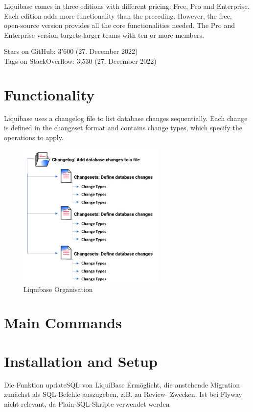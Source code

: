 %
Liquibase \cite{Liquibase} comes in three editions with different pricing: Free, Pro and Enterprise. Each edition adds more functionality than the preceding. However, the free, open-source version provides all the core functionalities needed. The Pro and Enterprise version targets larger teams with ten or more members. 

%
Stars on GitHub: 3'600 (27. December 2022)\\
Tags on StackOverflow: 3,530 (27. December 2022)\\

\section{Functionality}
%
Liquibase uses a changelog file to list database changes sequentially. Each change is defined in the changeset format and contains change types, which specify the operations to apply.

\begin{figure}[H]
	\centering
	\includegraphics[width=0.65\textwidth]{./chapters/intro_liquibase/images/changelog-structure.png}
	\caption[Liquibase Organisation - Source: \cite{Liquibase}]{Liquibase Organisation}
	\label{fig:IntroductionToLiquibase:LiquibaseChangelogStructure}
\end{figure}


\section{Main Commands}



\section{Installation and Setup}
Die Funktion updateSQL von LiquiBase
Ermöglicht, die anstehende Migration zunächst als SQL-Befehle auszugeben, z.B. zu Review- Zwecken.
Ist bei Flyway nicht relevant, da Plain-SQL-Skripte verwendet werden


\newpage